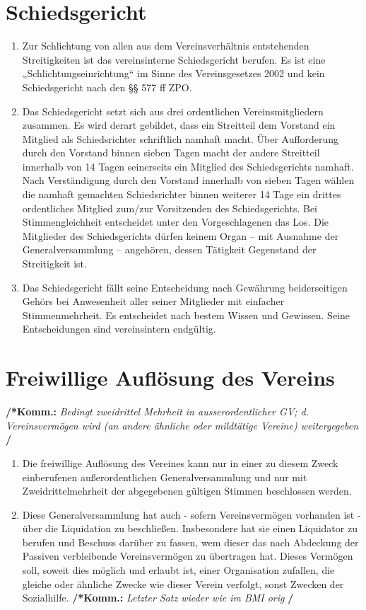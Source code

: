 \documentclass[a4paper,12pt]{article}
\newcommand{\comment}[1]{{\bf /*Komm.:} \textit{#1} {\bf */}}
\begin{document}
\section{Schiedsgericht} %
\begin{enumerate}

\item Zur Schlichtung von allen aus dem Vereinsverhältnis entstehenden Streitigkeiten ist das vereinsinterne Schiedsgericht berufen. Es ist eine „Schlichtungseinrichtung“ im Sinne des Vereinsgesetzes 2002 und kein Schiedsgericht nach den §§ 577 ff ZPO.

\item Das Schiedsgericht setzt sich aus drei ordentlichen Vereinsmitgliedern zusammen.
Es wird derart gebildet, dass ein Streitteil dem Vorstand ein Mitglied als Schiedsrichter schriftlich namhaft macht.
Über Aufforderung durch den Vorstand binnen sieben Tagen macht der andere Streitteil innerhalb von 14 Tagen seinerseits ein Mitglied des Schiedsgerichts namhaft.
Nach Verständigung durch den Vorstand innerhalb von sieben Tagen wählen die namhaft gemachten Schiedsrichter binnen weiterer 14 Tage ein drittes ordentliches Mitglied zum/zur Vorsitzenden des Schiedsgerichts.
Bei Stimmengleichheit entscheidet unter den Vorgeschlagenen das Los. Die Mitglieder des Schiedsgerichts dürfen keinem Organ – mit Ausnahme der Generalversammlung – angehören, dessen Tätigkeit Gegenstand der Streitigkeit ist.

\item Das Schiedsgericht fällt seine Entscheidung nach Gewährung beiderseitigen Gehörs bei Anwesenheit aller seiner Mitglieder mit einfacher Stimmenmehrheit.
Es entscheidet nach bestem Wissen und Gewissen. Seine Entscheidungen sind vereinsintern endgültig.

\end{enumerate}

\section{Freiwillige Auflösung des Vereins} %
\comment{Bedingt zweidrittel Mehrheit in ausserordentlicher GV; d. Vereinsvermögen wird (an andere ähnliche oder mildtätige Vereine)  weitergegeben}
\begin{enumerate}
\item Die freiwillige Auflösung des Vereines kann nur in einer zu diesem Zweck einberufenen außerordentlichen Generalversammlung und nur mit Zweidrittelmehrheit der abgegebenen gültigen Stimmen beschlossen werden.
\item Diese Generalversammlung hat auch - sofern Vereinsvermögen vorhanden ist - über die Liquidation zu beschließen. Insbesondere hat sie einen Liquidator zu berufen und Beschuss darüber zu fassen, wem dieser das nach Abdeckung der Passiven verbleibende Vereinsvermögen zu übertragen hat.
Dieses Vermögen soll, soweit dies möglich und erlaubt ist, einer Organisation zufallen, die gleiche oder ähnliche Zwecke wie dieser Verein verfolgt, sonst Zwecken der Sozialhilfe.
\comment{Letzter Satz wieder wie im BMI orig}

\end{enumerate}
\end{document}
